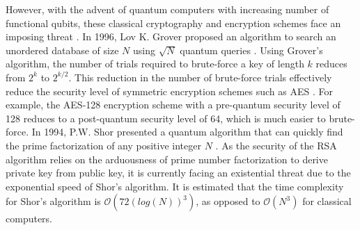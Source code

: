 \documentclass[a4paper]{cas-sc}
\begin{document}
However, with the advent of quantum computers with increasing number of functional qubits, these classical cryptography and encryption schemes face an imposing threat \cite{bernstein2017post}. In 1996, Lov K. Grover proposed an algorithm to search an unordered database of size $N$ using $\sqrt{N}$ quantum queries \cite{grover1996fast}. Using Grover's algorithm, the number of trials required to brute-force a key of length $k$ reduces from $2^{k}$ to $2^{k/2}$. This reduction in the number of brute-force trials effectively reduce the security level of symmetric encryption schemes such as AES \cite{Daemen2002}. For example, the AES-128 encryption scheme with a pre-quantum security level of 128 reduces to a post-quantum security level of 64, which is much easier to brute-force. In 1994, P.W. Shor presented a quantum algorithm that can quickly find the prime factorization of any positive integer $N$ \cite{Shor1997}. As the security of the RSA algorithm relies on the arduousness of prime number factorization to derive private key from public key, it is currently facing an existential threat due to the exponential speed of Shor's algorithm. It is estimated that the time complexity for Shor's algorithm is $\mathcal{O}(72(log(N))^{3})$, as opposed to $\mathcal{O}(N^3)$ for classical computers.
\end{document}
